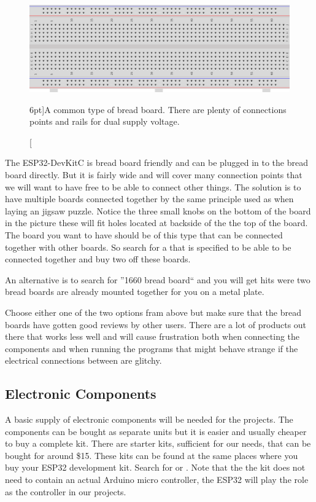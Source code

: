 \documentclass{tufte-book}
\begin{document}
\begin{figure}
	\includegraphics{bread_board.png}
	\caption[Bread board $n$.][6pt]{A common type of bread board. There are plenty of connections points and rails for dual supply voltage.}
	\label{fig:bread_board}
\end{figure}

The ESP32-DevKitC is bread board friendly and can be plugged in to the bread 
board directly. But it is fairly wide and will cover many connection points 
that we will want to have free to be able to connect other things. 
The solution is to have multiple boards connected together by the same 
principle used as when laying an jigsaw puzzle. Notice the three small knobs on 
the bottom of the board in the picture these will fit holes located at backside 
of the the top of the board. The board you want to have should be of this type 
that can be connected together with other boards. So search for a
 that is specified to be able to be connected
together and buy two off these boards.

An alternative is to search for ''1660 bread board`` and you will get hits were 
two bread boards are already mounted together for you on a metal plate.

Choose either one of the two options fram above but make sure that the bread
boards have gotten good reviews by other users. There are a lot of 
products out there that works less well and will cause frustration both when 
connecting the components and when running the programs that might behave 
strange if the electrical connections between are glitchy.

\subsection{Electronic Components}
A basic supply of electronic components will be needed for the projects. 
The components can be bought as separate units but it is easier and usually 
cheaper to buy a complete kit. There are starter kits, sufficient for our 
needs, that can be bought for around \$15. These kits can be found at the same 
places where you buy your ESP32 development kit. Search for 
 or . 
Note that the the kit does not need to contain an actual Arduino micro 
controller, the ESP32 will play the role as the controller in our projects.
\end{document}
